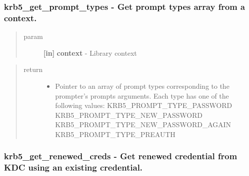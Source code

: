 \documentclass[letterpaper,10pt,english]{sphinxmanual}
\begin{document}
\subsubsection{krb5\_get\_prompt\_types -  Get prompt types array from a context.}
\label{appdev/refs/api/krb5_get_prompt_types::doc}\label{appdev/refs/api/krb5_get_prompt_types:krb5-get-prompt-types-get-prompt-types-array-from-a-context}

\begin{fulllineitems}
\label{appdev/refs/api/krb5_get_prompt_types:krb5_get_prompt_types}
\end{fulllineitems}

\begin{quote}\begin{description}
\item[{param}] \leavevmode
\textbf{{[}in{]}} \textbf{context} - Library context

\end{description}\end{quote}
\begin{quote}\begin{description}
\item[{return}] \leavevmode\begin{itemize}
\item {} 
Pointer to an array of prompt types corresponding to the prompter's prompts arguments. Each type has one of the following values: KRB5\_PROMPT\_TYPE\_PASSWORD KRB5\_PROMPT\_TYPE\_NEW\_PASSWORD KRB5\_PROMPT\_TYPE\_NEW\_PASSWORD\_AGAIN KRB5\_PROMPT\_TYPE\_PREAUTH

\end{itemize}

\end{description}\end{quote}


\subsubsection{krb5\_get\_renewed\_creds -  Get renewed credential from KDC using an existing credential.}
\label{appdev/refs/api/krb5_get_renewed_creds:krb5-get-renewed-creds-get-renewed-credential-from-kdc-using-an-existing-credential}\label{appdev/refs/api/krb5_get_renewed_creds::doc}
\end{document}
